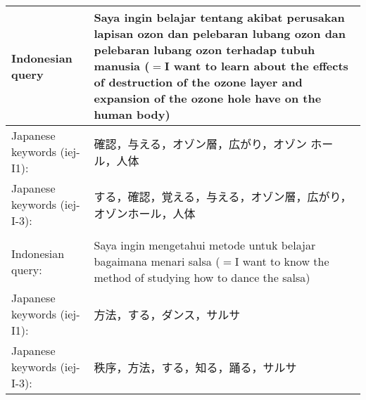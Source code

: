 \documentclass[english]{jnlp_1.3c}
\begin{document}
\begin{table}[t]
 \label{table:9}
 \begin{center}
  \begin{tabular}{|l|l|}\hline
    \multicolumn{1}{|p{12em}|}{Indonesian query}
     &    \multicolumn{1}{|p{28em}|}{Saya ingin belajar tentang akibat
     perusakan lapisan ozon dan pelebaran lubang ozon dan pelebaran
     lubang ozon terhadap tubuh manusia ($=$I want to learn about the
     effects of destruction of the ozone layer and expansion of the ozone
     hole have on the human body)}   \\  \hline
      \multicolumn{1}{|p{12em}|}{Japanese keywords (iej-I1):}
     &    \multicolumn{1}{|p{28em}|}{確認，与える，オゾン層，広がり，オゾン
   ホール，人体}   \\  \hline
   \multicolumn{1}{|p{12em}|}{Japanese keywords (iej-I-3):}
     &    \multicolumn{1}{|p{28em}|}{する，確認，覚える，与える，オゾン層，広がり，
   オゾンホール，人体}   \\  \hline
     \multicolumn{2}{|l|}{} \\ \hline
     \multicolumn{1}{|p{12em}|}{Indonesian query:}
     &    \multicolumn{1}{|p{28em}|}{Saya ingin mengetahui metode untuk
     belajar bagaimana menari salsa ($=$I want to know the method of
     studying how to dance the salsa)}   \\  \hline
       \multicolumn{1}{|p{12em}|}{Japanese keywords (iej-I1):}
     &    \multicolumn{1}{|p{28em}|}{方法，する，ダンス，サルサ}   \\
   \hline
    \multicolumn{1}{|p{12em}|}{Japanese keywords (iej-I-3):}
     &    \multicolumn{1}{|p{28em}|}{秩序，方法，する，知る，踊る，サルサ}   \\  \hline
  \end{tabular}
 \end{center}
\end{table}
\end{document}
